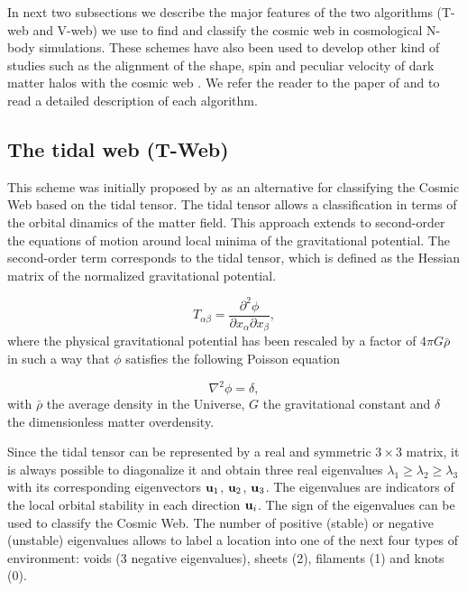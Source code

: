 \documentclass[a4,useAMS,usenatbib,usegraphicx]{mn2e}
\newcommand{\eq}[2]{\begin{equation} \label{eq:#1} #2 \end{equation}}
\begin{document}
In next two subsections we describe the major features of the two
algorithms (T-web and V-web) we use to find and classify the cosmic web in cosmological
N-body simulations. 
These schemes have also been used to develop other kind of studies
such as the alignment of the shape, spin and peculiar velocity of dark
matter halos with the cosmic web \citep{Libeskind13,Forero2014}.
We refer the reader to the paper of \cite{Forero09} and
\cite{Hoffman12} to read a detailed description of each algorithm. 


\subsection{The tidal web (T-Web)}
\label{subsec:Tweb}


This scheme was initially proposed by \citet{Hahn07} as an
alternative for classifying the Cosmic Web based on the tidal tensor.
The tidal tensor allows a classification in terms of the orbital
dinamics of the matter field.
This approach extends to second-order the equations of motion around 
local minima of the gravitational potential. 
The second-order term corresponds to the tidal tensor, which is
defined as the Hessian matrix of the normalized gravitational
potential.


\eq{V_web}
{	T_{\alpha\beta} = \frac{\partial^2\phi}{\partial x_{\alpha}\partial x_{\beta}},	}
where the physical gravitational potential has been rescaled by a
factor of   $4\pi G\bar{\rho}$ in such a way that $\phi$ satisfies the following 
Poisson equation

\eq{Poisson}
{	\nabla^2\phi = \delta,	}
with $\bar{\rho}$ the average density in the Universe, $G$ the 
gravitational constant and $\delta$ the dimensionless matter
overdensity. 

Since the tidal tensor can be represented by a real and  symmetric
$3\times 3$ matrix, it is always possible to diagonalize  
it and obtain three real eigenvalues $\lambda_{1}\geq\lambda_{2}\geq
\lambda_3$ with its corresponding eigenvectors ${\bf u}_{1}$, ${\bf u}_{2}$,
${\bf u}_{3}$. 
The eigenvalues are indicators of the local  orbital stability
in each direction ${\bf u}_i$. 
The sign of the eigenvalues can be used to classify the Cosmic Web.
The number of positive (stable) or negative (unstable) eigenvalues allows 
to label a location into one of the next four types of environment: 
voids (3 negative eigenvalues), sheets (2), filaments (1) and knots (0). 
\end{document}
